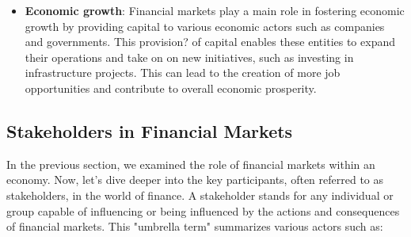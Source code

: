 \documentclass{article}
\begin{document}
\begin{itemize}
     \item \textbf{Economic growth}: Financial markets play a main role in fostering economic growth by providing capital to various economic actors such as companies and governments. This provision?  of capital enables these entities to expand their operations and take on on new initiatives, such as investing in infrastructure projects. This can lead to the creation of more job opportunities and contribute to overall economic prosperity.
\end{itemize}

\subsection{Stakeholders in Financial Markets} 
In the previous section, we examined the role of financial markets within an economy. Now, let's dive deeper into the key participants, often referred to as stakeholders, in the world of finance. A stakeholder stands for any individual or group capable of influencing or being influenced by the actions and consequences of financial markets. This "umbrella term" summarizes various actors such as:
\end{document}

